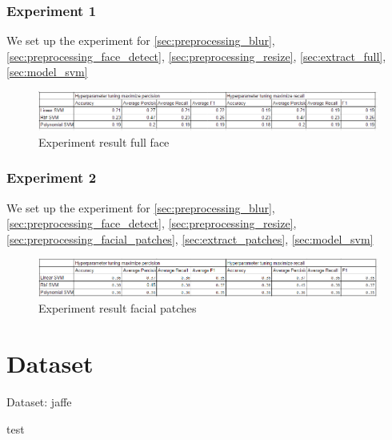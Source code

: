 \documentclass[a4paper, 12pt]{article}
\begin{document}
		\subsubsection{Experiment 1}
		We set up the experiment for \ref{sec:preprocessing_blur}, \ref{sec:preprocessing_face_detect}, \ref{sec:preprocessing_resize}, \ref{sec:extract_full}, \ref{sec:model_svm}
		\begin{figure}[H]
			\centering
			\includegraphics[width=1\linewidth]{./figure/experiment_result.png}
			\caption[]{Experiment result full face}
			\label{fig:result}
		\end{figure}
	
		\subsubsection{Experiment 2}
			We set up the experiment for \ref{sec:preprocessing_blur}, \ref{sec:preprocessing_face_detect}, \ref{sec:preprocessing_resize}, \ref{sec:preprocessing_facial_patches}, \ref{sec:extract_patches}, \ref{sec:model_svm}
			\begin{figure}[H]
				\centering
				\includegraphics[width=1\linewidth]{./figure/experiment2.png}
				\caption[]{Experiment result facial patches}
				\label{fig:result2}
			\end{figure}
		
\section{Dataset}
Dataset:  jaffe \cite{lyons1998japanese}

test \cite{Goodfellow-et-al-2016}





\end{document}
